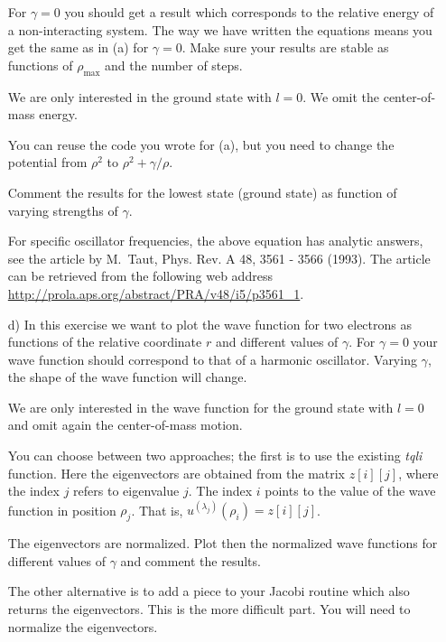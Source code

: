 \begin{prob}
\begin{enumerate}
For $\gamma =0$ you should get a result which corresponds to 
the relative energy of a non-interacting system.  The way we have written the equations means you get the same as in (a) for $\gamma =0$. 
Make sure your results are 
stable as functions of $\rho_{\mathrm{max}}$ and the number of steps.

We are only interested in the ground state with $l=0$. We omit the 
center-of-mass energy.

You can reuse the code you wrote for (a), 
but you need to change the potential
from $\rho^2$ to $\rho^2+\gamma/\rho$. 

Comment the results for the lowest state (ground state) as function of
varying strengths of $\gamma$. 


For specific oscillator frequencies, the above equation has analytic answers,
see the article by M.~Taut, Phys. Rev. A 48, 3561 - 3566 (1993).
The article can be retrieved from the following web address
\url{http://prola.aps.org/abstract/PRA/v48/i5/p3561_1}.

\item[d)]
In this exercise we want to plot the wave function 
for two electrons as functions of the relative coordinate $r$ and different
values of $\gamma$. For $\gamma =0$ your wave function should correspond to that
of a harmonic oscillator.  Varying $\gamma$, the shape of the wave function
will change.  

We are only interested in the wave function for the ground state with $l=0$ and
omit again the  center-of-mass motion.

You can choose between two approaches; the first is to use the existing
{\em tqli} function. Here the eigenvectors are obtained from the matrix
$z[i][j]$, where the index $j$ refers to eigenvalue $j$. The index $i$
points to the value of the wave function in position $\rho_j$.  
That is,  $u^{(\lambda_j)}(\rho_i)=z[i][j]$.   

The eigenvectors are normalized. 
Plot then the normalized wave functions for different 
values of $\gamma$ and comment the results.

The other alternative is to add a piece to your Jacobi routine which also
returns the eigenvectors. This is the more difficult part.
You will need to normalize the eigenvectors.


\end{enumerate}
\end{prob}





